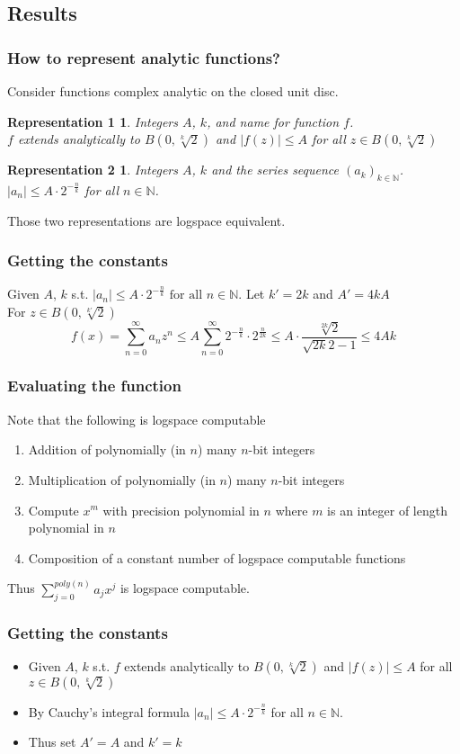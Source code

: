\documentclass[xcolor=pdftex,dvipsnames,table]{beamer}
\newcommand{\N}{\ensuremath{\mathbb{N}}}
\newcommand{\abs}[1]{\left|#1\right|}
\newtheorem{representation1}{Representation 1}
\newtheorem{representation2}{Representation 2}
\begin{document}
\subsection{Results}
\frametitle{How to represent analytic functions?}
\begin{frame}
  Consider functions complex analytic on the closed unit disc.
\begin{representation1}
  Integers $A$, $k$, and name for function $f$.\\
  $f$ extends analytically to $B(0, \sqrt[k]{2})$ and $\abs{f(z)} \leq A$ for all $z \in B(0, \sqrt[k]{2})$
\end{representation1}
\begin{representation2}
  Integers $A$, $k$ and the series sequence $(a_k)_{k \in \N}$.\\
  $\abs{a_n} \leq A \cdot 2^{-\frac{n}{k}}$ for all $n \in \N$.
\end{representation2}
Those two representations are logspace equivalent.
\end{frame}
\begin{frame}
\frametitle{Getting the constants}
Given $A$, $k$ s.t. 
  $\abs{a_n} \leq A \cdot 2^{-\frac{n}{k}} \text{ for all } n \in \N.$
Let $k' = 2k$ and $A' = 4kA$ \\
For $z \in B(0, \sqrt[k']{2})$
$$f(x) = \sum_{n=0}^\infty a_nz^n \leq A\sum_{n=0}^\infty 2^{-\frac{n}{k}} \cdot 2^{\frac{n}{2k}} \leq A \cdot \frac{\sqrt[2k]{2}}{\sqrt{2k}{2}-1} \leq 4Ak$$
\end{frame}
\begin{frame}
\frametitle{Evaluating the function}
Note that the following is logspace computable
\begin{enumerate}
\item Addition of polynomially (in $n$) many $n$-bit integers
\item Multiplication of polynomially (in $n$) many $n$-bit integers
\item Compute $x^m$ with precision polynomial in $n$ where $m$ is an integer of length polynomial in $n$
 \item Composition of a constant number of logspace computable functions
\end{enumerate}
Thus $\sum_{j=0}^{poly(n)} a_jx^j$ is logspace computable.
\end{frame}
\begin{frame}
\frametitle{Getting the constants}
\begin{itemize}
\item Given $A$, $k$ s.t. $f$ extends analytically to $B(0, \sqrt[k]{2})$ and $\abs{f(z)} \leq A$ for all $z \in B(0, \sqrt[k]{2})$
\item  By Cauchy's integral formula $\abs{a_n} \leq A \cdot 2^{-\frac{n}{k}}$ for all $n \in \N$.
\item Thus set $A' = A$ and $k' = k$
\end{itemize}
\end{frame}
\end{document}
